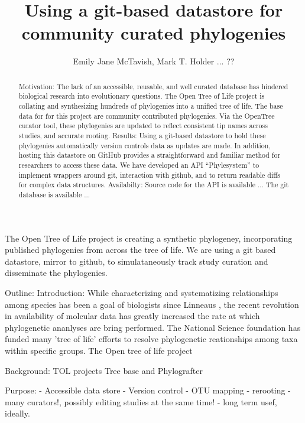 \documentclass[a4paper,10pt]{article}
\title{Using a git-based datastore for community curated phylogenies}
\author{Emily Jane McTavish, Mark T. Holder ... ??}
\begin{document}
\maketitle

\begin{abstract}
Motivation:
The lack of an accessible, reusable, and well curated database has hindered biological research into evolutionary questions.
The Open Tree of Life project is collating and synthesizing hundreds of phylogenies into a unified tree of life. 
The base data for for this project are community contributed phylogenies. 
Via the OpenTree curator tool, these phylogenies are updated to reflect consistent tip names across studies, and accurate rooting. 
Results:
Using a git-based datastore to hold these phylogenies automatically version controls data as updates are made. 
In addition, hosting this datastore on GitHub provides a straightforward and familiar method for researchers to access these data. 
We have developed an API ``Phylesystem'' to implement wrappers around git, interaction with github, and to return readable diffs for complex data structures.
Availabilty:
Source code for the API is available ...
The git database is available ...
\end{abstract}

\section{}
The Open Tree of Life project is creating a synthetic phylogeney, incorporating published phylogenies from across the tree of life.
We are using a git based datastore, mirror to github, to simulataneously track study curation and disseminate the phylogenies.

Outline:
 Introduction:
 While characterizing and systematizing relationships among species has been a goal of biologists since Linneaus \cite{Linneaus}, 
 the recent revolution in availability of molcular data has greatly increased the rate at which phylogenetic ananlyses are bring performed.
 The National Science foundation has funded many 'tree of life' efforts to resolve phylogenetic reationships among taxa within specific groups.
 The Open tree of life project 
 
 
  Background:
     TOL projects
     Tree base and Phylografter
  
  Purpose:
      - Accessible data store
      - Version control
          - OTU mapping
          - rerooting
          - many curators!, possibly editing studies at the same time!
          - long term usef, ideally.
\end{document}
